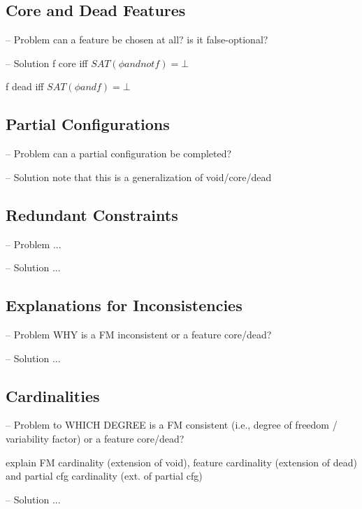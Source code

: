 \subsection{Core and Dead Features}
\begin{frame}{-- Problem}
    can a feature be chosen at all? is it false-optional?
\end{frame}
\begin{frame}{-- Solution}
    f core iff $SAT(\phi and not f) = \bot$
    
    f dead iff $SAT(\phi and f) = \bot$
\end{frame}

\subsection{Partial Configurations}
\begin{frame}{-- Problem}
    can a partial configuration be completed?
    \end{frame}
\begin{frame}{-- Solution}
    note that this is a generalization of void/core/dead
\end{frame}

\subsection{Redundant Constraints}
\begin{frame}{-- Problem}
    ...
\end{frame}
\begin{frame}{-- Solution}
    ...
\end{frame}

\subsection{Explanations for Inconsistencies} %
\begin{frame}{-- Problem}
    WHY is a FM inconsistent or a feature core/dead?
\end{frame}
\begin{frame}{-- Solution}
    ...
\end{frame}

\subsection{Cardinalities}
\begin{frame}{-- Problem}
    to WHICH DEGREE is a FM consistent (i.e., degree of freedom / variability factor) or a feature core/dead?

    explain FM cardinality (extension of void), feature cardinality (extension of dead) and partial cfg cardinality (ext. of partial cfg)
\end{frame}
\begin{frame}{-- Solution}
    ...
\end{frame}


